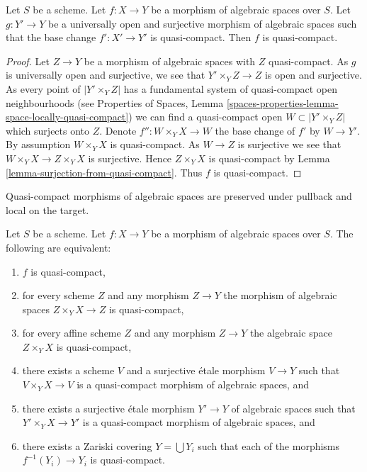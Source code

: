 \begin{lemma}
\label{lemma-descent-quasi-compact}
Let $S$ be a scheme.
Let $f : X \to Y$ be a morphism of algebraic spaces over $S$.
Let $g : Y' \to Y$ be a universally open and surjective morphism of
algebraic spaces such that the base change $f' : X' \to Y'$ is quasi-compact.
Then $f$ is quasi-compact.
\end{lemma}

\begin{proof}
Let $Z \to Y$ be a morphism of algebraic spaces with $Z$ quasi-compact.
As $g$ is universally open and surjective, we see that
$Y' \times_Y Z \to Z$ is open and surjective. As every point of
$|Y' \times_Y Z|$ has a fundamental system of quasi-compact open
neighbourhoods (see
Properties of Spaces,
Lemma \ref{spaces-properties-lemma-space-locally-quasi-compact})
we can find a quasi-compact open $W \subset |Y' \times_Y Z|$
which surjects onto $Z$. Denote
$f'' : W \times_Y X \to W$ the base change of $f'$ by $W \to Y'$.
By assumption $W \times_Y X$ is quasi-compact. As $W \to Z$ is surjective
we see that $W \times_Y X \to Z \times_Y X$ is surjective.
Hence $Z \times_Y X$ is quasi-compact by
Lemma \ref{lemma-surjection-from-quasi-compact}.
Thus $f$ is quasi-compact.
\end{proof}

\begin{lemma}
\label{lemma-quasi-compact-local}
\begin{slogan}
Quasi-compact morphisms of algebraic spaces are preserved under pullback
and local on the target.
\end{slogan}
Let $S$ be a scheme.
Let $f : X \to Y$ be a morphism of algebraic spaces over $S$.
The following are equivalent:
\begin{enumerate}
\item $f$ is quasi-compact,
\item for every scheme $Z$ and any morphism $Z \to Y$ the morphism of
algebraic spaces $Z \times_Y X \to Z$ is quasi-compact,
\item for every affine scheme $Z$ and any morphism
$Z \to Y$ the algebraic space $Z \times_Y X$ is quasi-compact,
\item there exists a scheme $V$ and a surjective \'etale morphism
$V \to Y$ such that $V \times_Y X \to V$ is a quasi-compact morphism
of algebraic spaces, and
\item there exists a surjective \'etale morphism
$Y' \to Y$ of algebraic spaces such that $Y' \times_Y X \to Y'$
is a quasi-compact morphism of algebraic spaces, and
\item there exists a Zariski covering $Y = \bigcup Y_i$ such that
each of the morphisms $f^{-1}(Y_i) \to Y_i$ is quasi-compact.
\end{enumerate}
\end{lemma}

